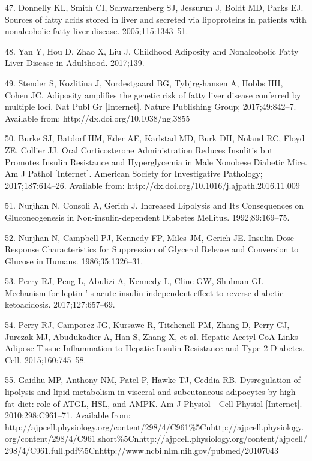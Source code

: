\documentclass[11pt]{article} %
\begin{document}
47. Donnelly KL, Smith CI, Schwarzenberg SJ, Jessurun J, Boldt MD, Parks
EJ. Sources of fatty acids stored in liver and secreted via lipoproteins
in patients with nonalcoholic fatty liver disease. 2005;115:1343--51.

48. Yan Y, Hou D, Zhao X, Liu J. Childhood Adiposity and Nonalcoholic
Fatty Liver Disease in Adulthood. 2017;139.

49. Stender S, Kozlitina J, Nordestgaard BG, Tybjrg-hansen A, Hobbs HH,
Cohen JC. Adiposity amplifies the genetic risk of fatty liver disease
conferred by multiple loci. Nat Publ Gr {[}Internet{]}. Nature
Publishing Group; 2017;49:842--7. Available from:
http://dx.doi.org/10.1038/ng.3855

50. Burke SJ, Batdorf HM, Eder AE, Karlstad MD, Burk DH, Noland RC,
Floyd ZE, Collier JJ. Oral Corticosterone Administration Reduces
Insulitis but Promotes Insulin Resistance and Hyperglycemia in Male
Nonobese Diabetic Mice. Am J Pathol {[}Internet{]}. American Society for
Investigative Pathology; 2017;187:614--26. Available from:
http://dx.doi.org/10.1016/j.ajpath.2016.11.009

51. Nurjhan N, Consoli A, Gerich J. Increased Lipolysis and Its
Consequences on Gluconeogenesis in Non-insulin-dependent Diabetes
Mellitus. 1992;89:169--75.

52. Nurjhan N, Campbell PJ, Kennedy FP, Miles JM, Gerich JE. Insulin
Dose-Response Characteristics for Suppression of Glycerol Release and
Conversion to Glucose in Humans. 1986;35:1326--31.

53. Perry RJ, Peng L, Abulizi A, Kennedy L, Cline GW, Shulman GI.
Mechanism for leptin ' s acute insulin-independent effect to reverse
diabetic ketoacidosis. 2017;127:657--69.

54. Perry RJ, Camporez JG, Kursawe R, Titchenell PM, Zhang D, Perry CJ,
Jurczak MJ, Abudukadier A, Han S, Zhang X, et al. Hepatic Acetyl CoA
Links Adipose Tissue Inflammation to Hepatic Insulin Resistance and Type
2 Diabetes. Cell. 2015;160:745--58.

55. Gaidhu MP, Anthony NM, Patel P, Hawke TJ, Ceddia RB. Dysregulation
of lipolysis and lipid metabolism in visceral and subcutaneous
adipocytes by high-fat diet: role of ATGL, HSL, and AMPK. Am J Physiol -
Cell Physiol {[}Internet{]}. 2010;298:C961--71. Available from:
http://ajpcell.physiology.org/content/298/4/C961\%5Cnhttp://ajpcell.physiology.org/content/298/4/C961.short\%5Cnhttp://ajpcell.physiology.org/content/ajpcell/298/4/C961.full.pdf\%5Cnhttp://www.ncbi.nlm.nih.gov/pubmed/20107043
\end{document}
